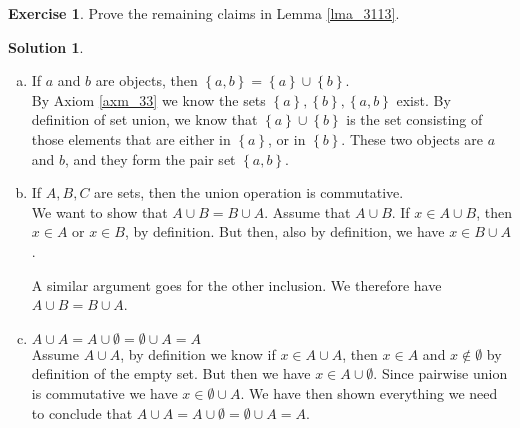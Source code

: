 \documentclass[a4paper, twocolumn]{report}
\newcounter{exercise} \numberwithin{exercise}{section}
\theoremstyle{definition}
\newtheorem{exc}[exercise]{Exercise}
\theoremstyle{solution}
\newtheorem*{sltn}{Solution}
\newcommand{\union}{\cup}
\begin{document}
\begin{exc}
  Prove the remaining claims in Lemma \ref{lma_3113}.
\end{exc}
\begin{sltn}
  \begin{enumerate}[(a)]
    \item If $a$ and $b$ are objects, then $\left\{ a, b \right\} = \left\{ a \right\} \union \left\{ b \right\}$. \\
      [0.2cm]
      By Axiom \ref{axm_33} we know the sets $\left\{ a \right\}, \left\{ b
      \right\}, \left\{ a, b \right\}$ exist. By definition of set union, we
      know that $\left\{ a \right\} \union \left\{ b \right\}$ is the set
      consisting of those elements that are either in $\left\{ a \right\}$, or
      in $\left\{ b \right\}$. These two objects are $a$ and $b$, and they form
      the pair set $\left\{ a, b \right\}$. 

    \item If $A, B, C$ are sets, then the union operation is commutative. \\
      [0.2cm]
      We want to show that $A \union B = B \union A$.  Assume that $A \union
      B$. If $x \in A \union B$, then $x \in A$ or $x \in B$, by definition.
      But then, also by definition, we have $x \in B \union A$.  
      
      A similar argument goes for the other inclusion.  We therefore have $A
      \union B = B \union A$. 

    \item $A \union A = A \union \emptyset = \emptyset \union A = A$ \\
      [0.2cm]
      Assume $A \union A$, by definition we know if $x \in A \union A$, then $x
      \in A$ and $x \notin \emptyset$ by definition of the empty set. But then
      we have $x \in A \union \emptyset$.  Since pairwise union is commutative
      we have $x \in \emptyset \union A$. We have then shown everything we need
      to conclude that $A \union A = A \union \emptyset = \emptyset \union A =
      A$.
  \end{enumerate}
\end{sltn}
\end{document}
